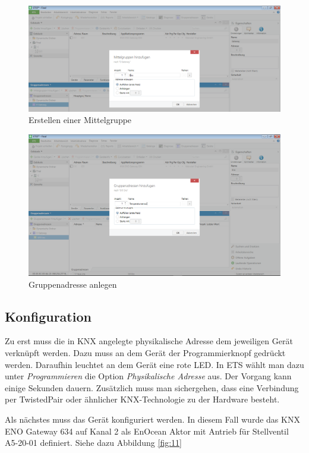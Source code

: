 \documentclass[a4paper]{article}
\begin{document}
\begin{figure}[H]
	\centering
	\includegraphics[width=13cm]{Doku/7n}
	\caption{Erstellen einer Mittelgruppe}
	\label{fig:7}
\end{figure}

\begin{figure}[H]
	\centering
	\includegraphics[width=13cm]{Doku/8}
	\caption{Gruppenadresse anlegen}
	\label{fig:8}
\end{figure}

\subsection{Konfiguration}
Zu erst muss die in KNX angelegte physikalische Adresse dem jeweiligen Gerät verknüpft werden. Dazu muss an dem Gerät der Programmierknopf gedrückt werden. Daraufhin leuchtet an dem Gerät eine rote LED. In ETS wählt man dazu unter \emph{Programmieren} die Option \emph{Physikalische Adresse} aus. Der Vorgang kann einige Sekunden dauern. Zusätzlich muss man sichergehen, dass eine Verbindung per TwistedPair oder ähnlicher KNX-Technologie zu der Hardware besteht.

Als nächstes muss das Gerät konfiguriert werden. In diesem Fall wurde das KNX ENO Gateway 634 auf Kanal 2 als EnOcean Aktor mit Antrieb für Stellventil A5-20-01 definiert. Siehe dazu Abbildung \ref{fig:11}
\end{document}
